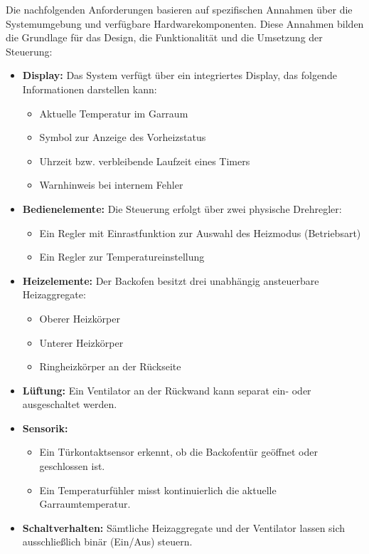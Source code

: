 \documentclass[a4paper,12pt]{article}
\begin{document}
Die nachfolgenden Anforderungen basieren auf spezifischen Annahmen über die Systemumgebung und verfügbare Hardwarekomponenten. Diese Annahmen bilden die Grundlage für das Design, die Funktionalität und die Umsetzung der Steuerung:

\begin{itemize}
    \item \textbf{Display:}  
    Das System verfügt über ein integriertes Display, das folgende Informationen darstellen kann:
    \begin{itemize}
        \item Aktuelle Temperatur im Garraum
        \item Symbol zur Anzeige des Vorheizstatus
        \item Uhrzeit bzw. verbleibende Laufzeit eines Timers
        \item Warnhinweis bei internem Fehler
    \end{itemize}

    \item \textbf{Bedienelemente:}  
    Die Steuerung erfolgt über zwei physische Drehregler:
    \begin{itemize}
        \item Ein Regler mit Einrastfunktion zur Auswahl des Heizmodus (Betriebsart)
        \item Ein Regler zur Temperatureinstellung
    \end{itemize}

    \item \textbf{Heizelemente:}  
    Der Backofen besitzt drei unabhängig ansteuerbare Heizaggregate:
    \begin{itemize}
        \item Oberer Heizkörper
        \item Unterer Heizkörper
        \item Ringheizkörper an der Rückseite
    \end{itemize}

    \item \textbf{Lüftung:}  
    Ein Ventilator an der Rückwand kann separat ein- oder ausgeschaltet werden.

    \item \textbf{Sensorik:}  
    \begin{itemize}
        \item Ein Türkontaktsensor erkennt, ob die Backofentür geöffnet oder geschlossen ist.
        \item Ein Temperaturfühler misst kontinuierlich die aktuelle Garraumtemperatur.
    \end{itemize}

    \item \textbf{Schaltverhalten:}  
    Sämtliche Heizaggregate und der Ventilator lassen sich ausschließlich binär (Ein/Aus) steuern.
\end{itemize}
\end{document}
